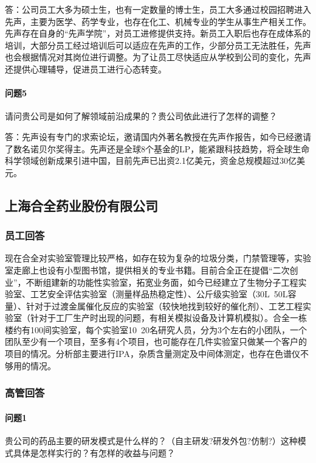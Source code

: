 \documentclass[twocolumn,openany]{ctexbook}
\begin{document}
	答：公司员工大多为硕士生，也有一定数量的博士生，员工大多通过校园招聘进入先声，主要为医学、药学专业，也存在化工、机械专业的学生从事生产相关工作。先声存在自身的“先声学院”，对员工进修提供支持。新员工入职后也存在成体系的培训，大部分员工经过培训后可以适应在先声的工作，少部分员工无法胜任，先声也会根据情况对其岗位进行调整。为了让员工尽快适应从学校到公司的变化，先声还提供心理辅导，促进员工进行心态转变。
	
	\paragraph{问题5}请问贵公司是如何了解领域前沿成果的？贵公司依此进行了怎样的调整？
	
	答：先声设有专门的求索论坛，邀请国内外著名教授在先声作报告，如今已经邀请了数名诺贝尔奖得主。先声还是全球8个基金的LP，能紧跟科技趋势，将全球生命科学领域创新成果引进中国，目前先声已出资2.1亿美元，资金总规模超过30亿美元。
	
	
	\subsection*{上海合全药业股份有限公司}
	\subsubsection*{员工回答}
	现在合全对实验室管理比较严格，如存在较为复杂的垃圾分类，门禁管理等，实验室走廊上也设有小型图书馆，提供相关的专业书籍。目前合全正在提倡“二次创业”，不断组建新的功能性实验室，拓宽业务面，如今已经建立了生物分子工程实验室、工艺安全评估实验室（测量样品热稳定性）、公斤级实验室（30L~50L容量）、针对于过渡金属催化反应的实验室（较快地找到较好的催化剂）、工艺工程实验室（针对于工厂生产时出现的问题，有相关模拟设备及计算机模拟）。合全一栋楼约有100间实验室，每个实验室10~20名研究人员，分为3个左右的小团队，一个团队至少有一个项目，至多有4个项目，也可能存在几件实验室只做某一个客户的项目的情况。分析部主要进行IPA，杂质含量测定及中间体测定，也存在色谱仪不够用的情况。
	
	\subsubsection*{高管回答}
	
	\paragraph{问题1}贵公司的药品主要的研发模式是什么样的？（自主研发?研发外包?仿制?）这种模式具体是怎样实行的？有怎样的收益与问题？
	
\end{document}
